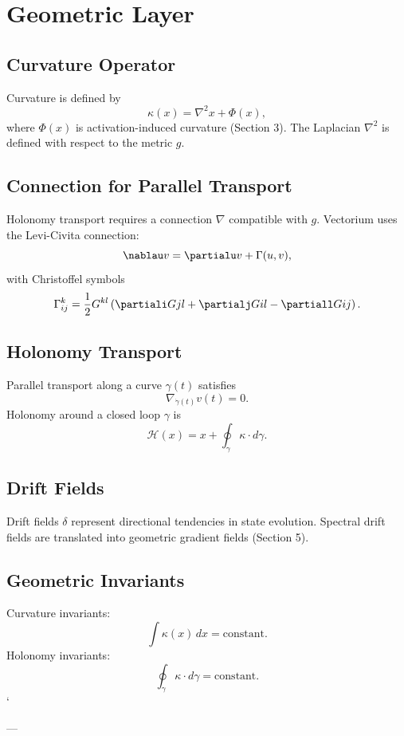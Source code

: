 \documentclass[11pt]{article}
\begin{document}
\section{Geometric Layer}

\subsection{Curvature Operator}
Curvature is defined by
\[
\kappa(x) = \nabla^2 x + \Phi(x),
\]
where $\Phi(x)$ is activation-induced curvature (Section 3). The Laplacian
$\nabla^2$ is defined with respect to the metric $g$.

\subsection{Connection for Parallel Transport}
Holonomy transport requires a connection $\nabla$ compatible with $g$. Vectorium
uses the Levi-Civita connection:
\[
\nablau v = \partialu v + \Gamma(u, v),
\]
with Christoffel symbols
\[
\Gamma^k_{ij} = \frac{1}{2} G^{kl}
\left(
\partiali G{jl}
+ \partialj G{il}
- \partiall G{ij}
\right).
\]

\subsection{Holonomy Transport}
Parallel transport along a curve $\gamma(t)$ satisfies
\[
\nabla_{\dot{\gamma}(t)} v(t) = 0.
\]
Holonomy around a closed loop $\gamma$ is
\[
\mathcal{H}(x) = x + \oint_{\gamma} \kappa \cdot d\gamma.
\]

\subsection{Drift Fields}
Drift fields $\delta$ represent directional tendencies in state evolution.
Spectral drift fields are translated into geometric gradient fields (Section 5).

\subsection{Geometric Invariants}
Curvature invariants:
\[
\int \kappa(x) \, dx = \text{constant}.
\]
Holonomy invariants:
\[
\oint_{\gamma} \kappa \cdot d\gamma = \text{constant}.
\]
`

---
\end{document}
